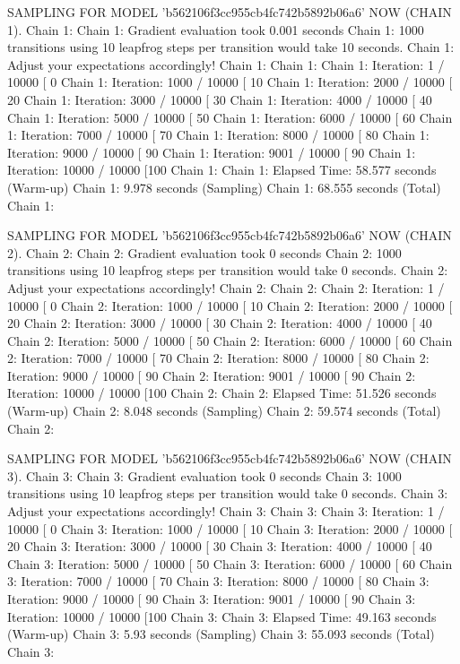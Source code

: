 \documentclass[
]{jss}
\begin{document}
\begin{CodeChunk}
\begin{CodeOutput}
SAMPLING FOR MODEL 'b562106f3cc955cb4fc742b5892b06a6' NOW (CHAIN 1).
Chain 1: 
Chain 1: Gradient evaluation took 0.001 seconds
Chain 1: 1000 transitions using 10 leapfrog steps per transition would take 10 seconds.
Chain 1: Adjust your expectations accordingly!
Chain 1: 
Chain 1: 
Chain 1: Iteration:    1 / 10000 [  0%
Chain 1: Iteration: 1000 / 10000 [ 10%
Chain 1: Iteration: 2000 / 10000 [ 20%
Chain 1: Iteration: 3000 / 10000 [ 30%
Chain 1: Iteration: 4000 / 10000 [ 40%
Chain 1: Iteration: 5000 / 10000 [ 50%
Chain 1: Iteration: 6000 / 10000 [ 60%
Chain 1: Iteration: 7000 / 10000 [ 70%
Chain 1: Iteration: 8000 / 10000 [ 80%
Chain 1: Iteration: 9000 / 10000 [ 90%
Chain 1: Iteration: 9001 / 10000 [ 90%
Chain 1: Iteration: 10000 / 10000 [100%
Chain 1: 
Chain 1:  Elapsed Time: 58.577 seconds (Warm-up)
Chain 1:                9.978 seconds (Sampling)
Chain 1:                68.555 seconds (Total)
Chain 1: 

SAMPLING FOR MODEL 'b562106f3cc955cb4fc742b5892b06a6' NOW (CHAIN 2).
Chain 2: 
Chain 2: Gradient evaluation took 0 seconds
Chain 2: 1000 transitions using 10 leapfrog steps per transition would take 0 seconds.
Chain 2: Adjust your expectations accordingly!
Chain 2: 
Chain 2: 
Chain 2: Iteration:    1 / 10000 [  0%
Chain 2: Iteration: 1000 / 10000 [ 10%
Chain 2: Iteration: 2000 / 10000 [ 20%
Chain 2: Iteration: 3000 / 10000 [ 30%
Chain 2: Iteration: 4000 / 10000 [ 40%
Chain 2: Iteration: 5000 / 10000 [ 50%
Chain 2: Iteration: 6000 / 10000 [ 60%
Chain 2: Iteration: 7000 / 10000 [ 70%
Chain 2: Iteration: 8000 / 10000 [ 80%
Chain 2: Iteration: 9000 / 10000 [ 90%
Chain 2: Iteration: 9001 / 10000 [ 90%
Chain 2: Iteration: 10000 / 10000 [100%
Chain 2: 
Chain 2:  Elapsed Time: 51.526 seconds (Warm-up)
Chain 2:                8.048 seconds (Sampling)
Chain 2:                59.574 seconds (Total)
Chain 2: 

SAMPLING FOR MODEL 'b562106f3cc955cb4fc742b5892b06a6' NOW (CHAIN 3).
Chain 3: 
Chain 3: Gradient evaluation took 0 seconds
Chain 3: 1000 transitions using 10 leapfrog steps per transition would take 0 seconds.
Chain 3: Adjust your expectations accordingly!
Chain 3: 
Chain 3: 
Chain 3: Iteration:    1 / 10000 [  0%
Chain 3: Iteration: 1000 / 10000 [ 10%
Chain 3: Iteration: 2000 / 10000 [ 20%
Chain 3: Iteration: 3000 / 10000 [ 30%
Chain 3: Iteration: 4000 / 10000 [ 40%
Chain 3: Iteration: 5000 / 10000 [ 50%
Chain 3: Iteration: 6000 / 10000 [ 60%
Chain 3: Iteration: 7000 / 10000 [ 70%
Chain 3: Iteration: 8000 / 10000 [ 80%
Chain 3: Iteration: 9000 / 10000 [ 90%
Chain 3: Iteration: 9001 / 10000 [ 90%
Chain 3: Iteration: 10000 / 10000 [100%
Chain 3: 
Chain 3:  Elapsed Time: 49.163 seconds (Warm-up)
Chain 3:                5.93 seconds (Sampling)
Chain 3:                55.093 seconds (Total)
Chain 3: 


\end{CodeOutput}
\end{CodeChunk}
\end{document}
